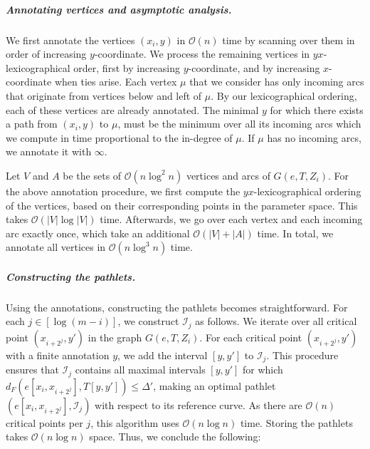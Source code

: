 \documentclass[a4paper,UKenglish,cleveref,thm-restate,notab]{lipics-v2021}
\newcommand{\dF}{\ensuremath{d_F}}
\newcommand{\bigO}{\mathcal{O}}
\newcommand{\I}{\mathcal{I}}
\begin{document}
\subparagraph*{Annotating vertices and asymptotic analysis.}
    We first annotate the vertices $(x_i, y)$ in $\bigO(n)$ time by scanning over them in order of increasing $y$-coordinate.
    We process the remaining vertices in $yx$-lexicographical order, first by increasing $y$-coordinate, and  by increasing $x$-coordinate when ties arise.
    Each vertex $\mu$ that we consider has only incoming arcs that originate from vertices below and left of $\mu$.
    By our lexicographical ordering, each of these vertices are already annotated. 
    The minimal $y$ for which there exists a path from $(x_i, y)$ to $\mu$, must be the minimum over all its incoming arcs which we compute in time proportional to the in-degree of $\mu$. 
    If $\mu$ has no incoming arcs, we annotate it with $\infty$. 
    
    Let $V$ and $A$ be the sets of $\bigO(n \log^2 n)$ vertices and arcs of $G(e, T, Z_i)$.
    For the above annotation procedure, we first compute the $yx$-lexicographical ordering of the vertices, based on their corresponding points in the parameter space.
    This takes $\bigO(|V| \log |V|)$ time.
    Afterwards, we go over each vertex and each incoming arc exactly once, which take an additional $\bigO(|V| + |A|)$ time.
    In total, we annotate all vertices in $\bigO(n \log^3 n)$ time.

\subparagraph*{Constructing the pathlets.}
    Using the annotations, constructing the pathlets becomes straightforward.
    For each $j \in [\log (m-i)]$, we construct $\I_j$ as follows.
    We iterate over all critical point $(x_{i+2^j}, y')$ in the graph $G(e, T, Z_i)$. 
    For each critical point $(x_{i+2^j}, y')$ with a finite annotation $y$, we add the interval $[y, y']$ to $\I_j$.
    This procedure ensures that $\I_j$ contains all maximal intervals $[y, y']$ for which $\dF(e[x_i, x_{i+2^j}], T[y, y']) \leq \Delta'$, making an optimal pathlet $(e[x_i, x_{i+2^j}], \I_j)$ with respect to its reference curve.
    As there are $\bigO(n)$ critical points per $j$, this algorithm uses $\bigO(n \log n)$ time.
    Storing the pathlets takes $\bigO(n \log n)$ space.
    Thus, we conclude the following:
\end{document}
